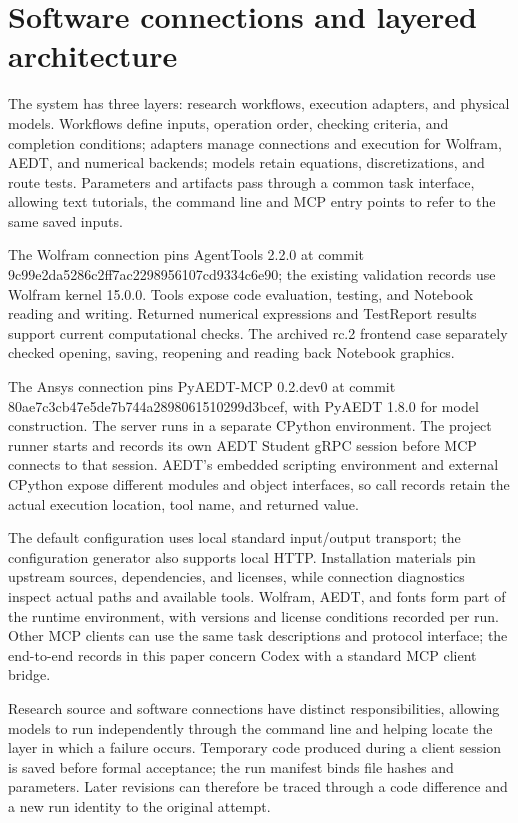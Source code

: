 \section{Software connections and layered architecture}
\label{chapter:02}

\hypertarget{auto.02.p1}{}
The system has three layers: research workflows, execution adapters, and physical models. Workflows define inputs, operation order, checking criteria, and completion conditions; adapters manage connections and execution for Wolfram, AEDT, and numerical backends; models retain equations, discretizations, and route tests. Parameters and artifacts pass through a common task interface, allowing text tutorials, the command line and MCP entry points to refer to the same saved inputs.

\hypertarget{auto.02.p2}{}
The Wolfram connection pins AgentTools 2.2.0 at commit 9c99e2da5286c2ff7ac2298956107cd9334c6e90; the existing validation records use Wolfram kernel 15.0.0. Tools expose code evaluation, testing, and Notebook reading and writing. Returned numerical expressions and TestReport results support current computational checks. The archived rc.2 frontend case separately checked opening, saving, reopening and reading back Notebook graphics. \cite{AGENTTOOLS}

\hypertarget{auto.02.p3}{}
The Ansys connection pins PyAEDT-MCP 0.2.dev0 at commit 80ae7c3cb47e5de7b744a2898061510299d3bcef, with PyAEDT 1.8.0 for model construction. The server runs in a separate CPython environment. The project runner starts and records its own AEDT Student gRPC session before MCP connects to that session. AEDT's embedded scripting environment and external CPython expose different modules and object interfaces, so call records retain the actual execution location, tool name, and returned value. \cite{PYAEDTMCP,PYAEDT,ANSYSCOMMONMCP}

\hypertarget{auto.02.p4}{}
The default configuration uses local standard input/output transport; the configuration generator also supports local HTTP. Installation materials pin upstream sources, dependencies, and licenses, while connection diagnostics inspect actual paths and available tools. Wolfram, AEDT, and fonts form part of the runtime environment, with versions and license conditions recorded per run. Other MCP clients can use the same task descriptions and protocol interface; the end-to-end records in this paper concern Codex with a standard MCP client bridge.

\hypertarget{auto.02.p5}{}
Research source and software connections have distinct responsibilities, allowing models to run independently through the command line and helping locate the layer in which a failure occurs. Temporary code produced during a client session is saved before formal acceptance; the run manifest binds file hashes and parameters. Later revisions can therefore be traced through a code difference and a new run identity to the original attempt.
